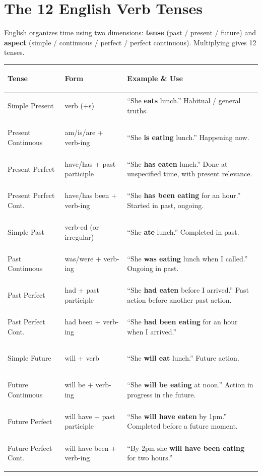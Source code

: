 \documentclass[11pt, letterpaper]{article}
\begin{document}
\vspace{8pt}

\section*{The 12 English Verb Tenses}

English organizes time using two dimensions: \textbf{tense} (past / present / future) and
\textbf{aspect} (simple / continuous / perfect / perfect continuous). Multiplying gives 12 tenses.

\noindent
{\small\renewcommand{\arraystretch}{1.6}
\begin{tabularx}{\textwidth}{>{\bfseries\raggedright\arraybackslash}p{3.2cm}
                              >{\raggedright\arraybackslash}p{4cm}
                              >{\raggedright\arraybackslash}X}
\toprule
\rowcolor{tableheaderorange}
\textbf{Tense} & \textbf{Form} & \textbf{Example \& Use} \\
\midrule
\rowcolor{rowOr} Simple Present       & verb (+s)                     & ``She \textbf{eats} lunch.'' Habitual / general truths. \\
\rowcolor{rowA}  Present Continuous   & am/is/are + verb-ing          & ``She \textbf{is eating} lunch.'' Happening now. \\
\rowcolor{rowOr} Present Perfect      & have/has + past participle    & ``She \textbf{has eaten} lunch.'' Done at unspecified time, with present relevance. \\
\rowcolor{rowA}  Present Perfect Cont.& have/has been + verb-ing      & ``She \textbf{has been eating} for an hour.'' Started in past, ongoing. \\
\rowcolor{rowOr} Simple Past          & verb-ed (or irregular)        & ``She \textbf{ate} lunch.'' Completed in past. \\
\rowcolor{rowA}  Past Continuous      & was/were + verb-ing           & ``She \textbf{was eating} lunch when I called.'' Ongoing in past. \\
\rowcolor{rowOr} Past Perfect         & had + past participle         & ``She \textbf{had eaten} before I arrived.'' Past action before another past action. \\
\rowcolor{rowA}  Past Perfect Cont.   & had been + verb-ing           & ``She \textbf{had been eating} for an hour when I arrived.'' \\
\rowcolor{rowOr} Simple Future        & will + verb                   & ``She \textbf{will eat} lunch.'' Future action. \\
\rowcolor{rowA}  Future Continuous    & will be + verb-ing            & ``She \textbf{will be eating} at noon.'' Action in progress in the future. \\
\rowcolor{rowOr} Future Perfect       & will have + past participle   & ``She \textbf{will have eaten} by 1pm.'' Completed before a future moment. \\
\rowcolor{rowA}  Future Perfect Cont. & will have been + verb-ing     & ``By 2pm she \textbf{will have been eating} for two hours.'' \\
\bottomrule
\end{tabularx}}
\end{document}
